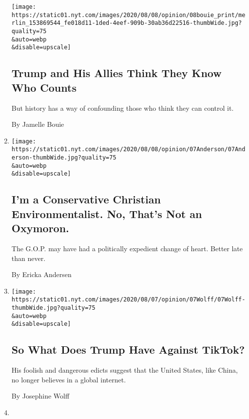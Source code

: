 \begin{enumerate}
  \texttt{[image: https://static01.nyt.com/images/2020/08/08/opinion/08bouie\_print/merlin\_153869544\_fe018d11-1ded-4eef-909b-30ab36d22516-thumbWide.jpg?quality=75\\\&auto=webp\\\&disable=upscale]}

  \hypertarget{trump-and-his-allies-think-they-know-who-counts}{%
  \subsection{Trump and His Allies Think They Know Who
  Counts}\label{trump-and-his-allies-think-they-know-who-counts}}

  But history has a way of confounding those who think they can control
  it.

  By Jamelle Bouie
\item
  \href{/2020/08/07/opinion/republicans-climate-change.html}{}

  \texttt{[image: https://static01.nyt.com/images/2020/08/08/opinion/07Anderson/07Anderson-thumbWide.jpg?quality=75\\\&auto=webp\\\&disable=upscale]}

  \hypertarget{im-a-conservative-christian-environmentalist-no-thats-not-an-oxymoron}{%
  \subsection{I'm a Conservative Christian Environmentalist. No, That's
  Not an
  Oxymoron.}\label{im-a-conservative-christian-environmentalist-no-thats-not-an-oxymoron}}

  The G.O.P. may have had a politically expedient change of heart.
  Better late than never.

  By Ericka Andersen
\item
  \href{/2020/08/07/opinion/tiktok-wechat-china-trump-executive-order.html}{}

  \texttt{[image: https://static01.nyt.com/images/2020/08/07/opinion/07Wolff/07Wolff-thumbWide.jpg?quality=75\\\&auto=webp\\\&disable=upscale]}

  \hypertarget{so-what-does-trump-have-against-tiktok}{%
  \subsection{So What Does Trump Have Against
  TikTok?}\label{so-what-does-trump-have-against-tiktok}}

  His foolish and dangerous edicts suggest that the United States, like
  China, no longer believes in a global internet.

  By Josephine Wolff
\item
  \href{/2020/08/07/opinion/latina-women-politics.html}{}


\end{enumerate}
